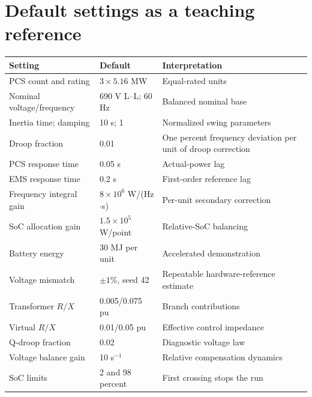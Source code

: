 \documentclass[11pt,a4paper]{article}
\begin{document}
\section{Default settings as a teaching reference}
\begin{longtable}{p{}p{}p{}}
\toprule Setting & Default & Interpretation\\\midrule\endhead
PCS count and rating & $3\times5.16$ MW & Equal-rated units\\
Nominal voltage/frequency & 690 V L--L; 60 Hz & Balanced nominal base\\
Inertia time; damping & 10 s; 1 & Normalized swing parameters\\
Droop fraction & 0.01 & One percent frequency deviation per unit of droop correction\\
PCS response time & 0.05 s & Actual-power lag\\
EMS response time & 0.2 s & First-order reference lag\\
Frequency integral gain & $8\times10^6$ W/(Hz$\cdot$s) & Per-unit secondary correction\\
SoC allocation gain & $1.5\times10^5$ W/point & Relative-SoC balancing\\
Battery energy & 30 MJ per unit & Accelerated demonstration\\
Voltage mismatch & $\pm1\%$, seed 42 & Repeatable hardware-reference estimate\\
Transformer $R/X$ & 0.005/0.075 pu & Branch contributions\\
Virtual $R/X$ & 0.01/0.05 pu & Effective control impedance\\
Q-droop fraction & 0.02 & Diagnostic voltage law\\
Voltage balance gain & 10 s$^{-1}$ & Relative compensation dynamics\\
SoC limits & 2 and 98 percent & First crossing stops the run\\
\bottomrule
\end{longtable}
\end{document}
